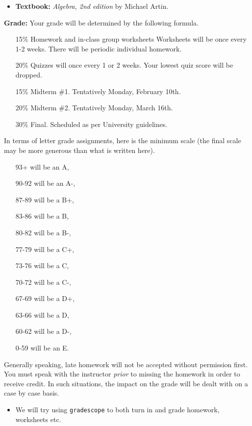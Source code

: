 \documentclass[oneside,10pt]{amsart}
\begin{document}
\begin{itemize}
 \item{} {\bf Textbook: }
 {\it Algebra, 2nd edition} by Michael Artin.
\end{itemize}
\vskip 12pt
 {\bf Grade:}  Your grade will be determined by the following formula.
\begin{itemize}
\item[15\%]  Homework and in-class group worksheets  Worksheets will be once every 1-2 weeks.  There will be periodic individual homework.  
\item[20\%]  Quizzes will once every 1 or 2 weeks.  Your lowest quiz score will be dropped.
\item[15\%]  Midterm \#1.  Tentatively Monday, February 10th.
\item[20\%]  Midterm \#2.  Tentatively Monday, March 16th.
\item[30\%]  Final.  Scheduled as per University guidelines.
\end{itemize}
In terms of letter grade assignments, here is the minimum scale (the final scale may be more generous than what is written here).  
\begin{multicols}{4}
\begin{itemize}
\item[93+] will be an A,
\item[90-92] will be an A-,
\item[87-89] will be a B+,
\item[83-86] will be a B,
\item[80-82] will be a B-,
\item[77-79] will be a C+,
\item[73-76] will be a C,
\item[70-72] will be a C-,
\item[67-69] will be a D+,
\item[63-66] will be a D,
\item[60-62] will be a D-,
\item[0-59] will be an E.
\end{itemize}
\end{multicols}
Generally speaking, late homework will not be accepted without permission first.  You must speak with the instructor \emph{prior} to missing the homework in order to receive credit.  In such situations, the impact on the grade will be dealt with on a case by case basis.  

\begin{itemize}
    \item{} We will try using {\tt gradescope} to both turn in and grade homework, worksheets etc.
\end{itemize}
\end{document}
